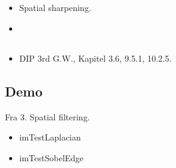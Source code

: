 \subsection{\subtopics}

\begin{itemize}
	\item Spatial sharpening.
	\item 
\end{itemize}

\subsection{\curriculum}

\begin{itemize}
	\item DIP 3rd G.W., Kapitel 3.6, 9.5.1, 10.2.5.
\end{itemize}

\subsection{Demo}

Fra 3. Spatial filtering.

\begin{itemize}
	\item imTestLaplacian
	\item imTestSobelEdge
\end{itemize}
